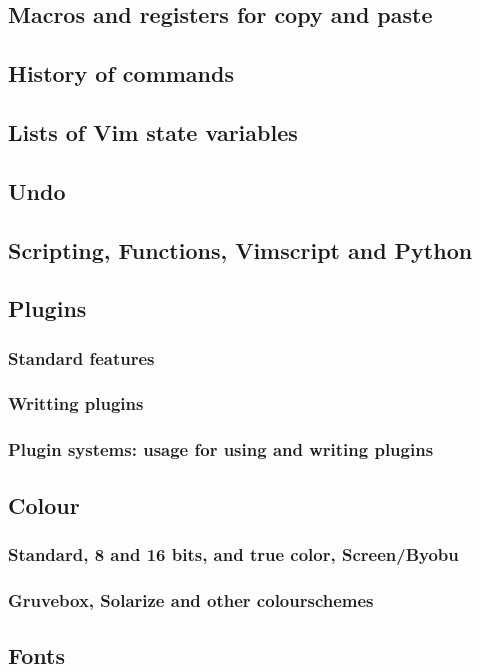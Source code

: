 \documentclass{article}
\begin{document}
\subsection{Macros and registers for copy and paste}
\subsection{History of commands}
\subsection{Lists of Vim state variables}
\subsection{Undo}
\subsection{Scripting, Functions, Vimscript and Python}
\subsection{Plugins}
\subsubsection{Standard features}
\subsubsection{Writting plugins}
\subsubsection{Plugin systems: usage for using and writing plugins}
\subsection{Colour}
\subsubsection{Standard, 8 and 16 bits, and true color, Screen/Byobu}
\subsubsection{Gruvebox, Solarize and other colourschemes}
\subsection{Fonts}
\end{document}
